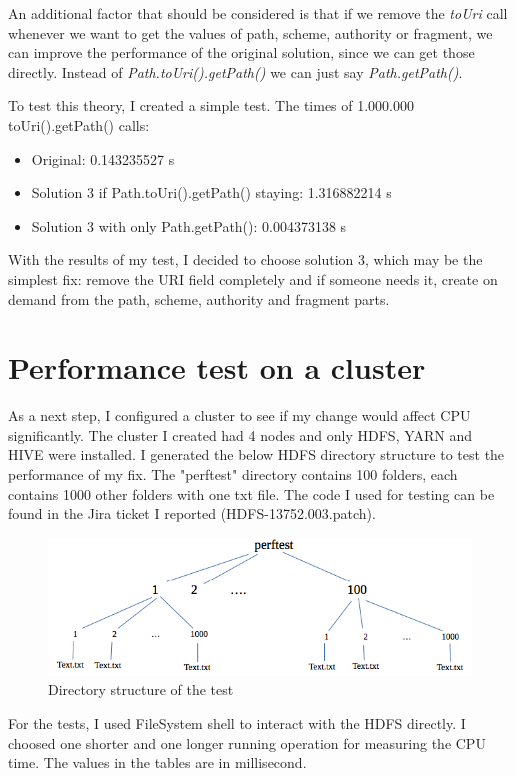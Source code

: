 An additional factor that should be considered is that if we remove the \textit{toUri} call whenever we want to get the values of path, scheme, authority or fragment, we can improve the performance of the original solution, since we can get those directly. Instead of \textit{Path.toUri().getPath() } we can just say \textit{Path.getPath()}.

To test this theory, I created a simple test. The times of 1.000.000 toUri().getPath() calls:
\begin{itemize}
	\item Original: 0.143235527 s
	\item Solution 3 if Path.toUri().getPath() staying: 1.316882214 s
	\item Solution 3 with only Path.getPath(): 0.004373138 s
\end{itemize}

With the results of my test, I decided to choose solution 3, which may be the simplest fix: remove the URI field completely and if someone needs it, create on demand from the path, scheme, authority and fragment parts.

\section{Performance test on a cluster}
As a next step, I configured a cluster to see if my change would affect CPU significantly. The cluster I created had 4 nodes and only HDFS, YARN and HIVE were installed. I generated the below HDFS directory structure to test the performance of my fix. The "perftest" directory contains 100 folders, each contains 1000 other folders with one txt file. The code I used for testing can be found in the Jira ticket I reported \cite{hdfs-path} (HDFS-13752.003.patch).

\begin{figure}[H]
	\includegraphics[width=125mm, keepaspectratio]{figures/directory_structure.png}
	\centering
	\caption{Directory structure of the test}
\end{figure}

For the tests, I used FileSystem shell to interact with the HDFS directly. I choosed one shorter and one longer running operation for measuring the CPU time. The values in the tables are in millisecond.

